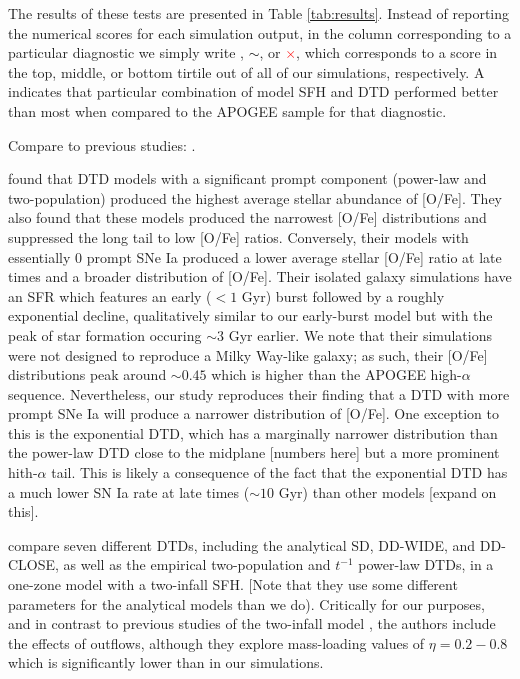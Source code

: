 \documentclass[twocolumn,twocolappendix,linenumbers]{aastex631}
\newcommand{\yes}{\textcolor{green}{\checkmark}}
\newcommand{\meh}{\textcolor{black}{$\sim$}}
\newcommand{\no}{\textcolor{red}{$\times$}}
\begin{document}
The results of these tests are presented in Table \ref{tab:results}. Instead of reporting the numerical scores for each simulation output, in the column corresponding to a particular diagnostic we simply write \yes, \meh, or \no, which corresponds to a score in the top, middle, or bottom tirtile out of all of our simulations, respectively. A \yes indicates that particular combination of model SFH and DTD performed better than most when compared to the APOGEE sample for that diagnostic.


Compare to previous studies: \citet{Poulhazan2018-PrecisionPollution,Palicio2023-AnalyticDTD}.

\citet{Poulhazan2018-PrecisionPollution} found that DTD models with a significant prompt component (power-law and two-population) produced the highest average stellar abundance of [O/Fe]. They also found that these models produced the narrowest [O/Fe] distributions and suppressed the long tail to low [O/Fe] ratios. Conversely, their models with essentially 0 prompt SNe Ia produced a lower average stellar [O/Fe] ratio at late times and a broader distribution of [O/Fe]. Their isolated galaxy simulations have an SFR which features an early ($<1$ Gyr) burst followed by a roughly exponential decline, qualitatively similar to our early-burst model but with the peak of star formation occuring $\sim3$ Gyr earlier. We note that their simulations were not designed to reproduce a Milky Way-like galaxy; as such, their [O/Fe] distributions peak around $\sim0.45$ which is higher than the APOGEE high-$\alpha$ sequence. Nevertheless, our study reproduces their finding that a DTD with more prompt SNe Ia will produce a narrower distribution of [O/Fe]. One exception to this is the exponential DTD, which has a marginally narrower distribution than the power-law DTD close to the midplane [numbers here] but a more prominent hith-$\alpha$ tail. This is likely a consequence of the fact that the exponential DTD has a much lower SN Ia rate at late times ($\sim10$ Gyr) than other models [expand on this].

\citet{Palicio2023-AnalyticDTD} compare seven different DTDs, including the analytical SD, DD-WIDE, and DD-CLOSE, as well as the empirical two-population and $t^{-1}$ power-law DTDs, in a one-zone model with a two-infall SFH. [Note that they use some different parameters for the analytical models than we do). Critically for our purposes, and in contrast to previous studies of the two-infall model \citep[e.g.,][others]{Chiappini1997-TwoInfall,Spitoni2021-TwoInfall}, the authors include the effects of outflows, although they explore mass-loading values of $\eta=0.2-0.8$ which is significantly lower than in our simulations.
\end{document}
